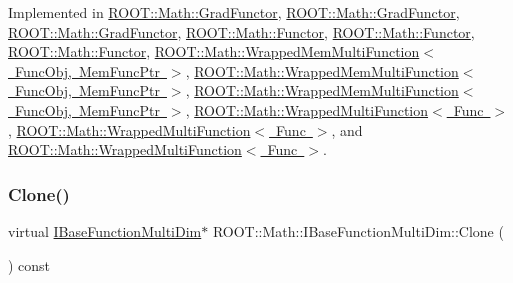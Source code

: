 Implemented in \mbox{\hyperlink{classROOT_1_1Math_1_1GradFunctor_a21093c0d3001069e49ce6278b5a32a40}{R\+O\+O\+T\+::\+Math\+::\+Grad\+Functor}}, \mbox{\hyperlink{classROOT_1_1Math_1_1GradFunctor_a21093c0d3001069e49ce6278b5a32a40}{R\+O\+O\+T\+::\+Math\+::\+Grad\+Functor}}, \mbox{\hyperlink{classROOT_1_1Math_1_1GradFunctor_a21093c0d3001069e49ce6278b5a32a40}{R\+O\+O\+T\+::\+Math\+::\+Grad\+Functor}}, \mbox{\hyperlink{classROOT_1_1Math_1_1Functor_a989f9b6dd160ebe03911cdee00dacaad}{R\+O\+O\+T\+::\+Math\+::\+Functor}}, \mbox{\hyperlink{classROOT_1_1Math_1_1Functor_a989f9b6dd160ebe03911cdee00dacaad}{R\+O\+O\+T\+::\+Math\+::\+Functor}}, \mbox{\hyperlink{classROOT_1_1Math_1_1Functor_a989f9b6dd160ebe03911cdee00dacaad}{R\+O\+O\+T\+::\+Math\+::\+Functor}}, \mbox{\hyperlink{classROOT_1_1Math_1_1WrappedMemMultiFunction_ab9f49fc9a151e8d921dbe9cb148c1fc8}{R\+O\+O\+T\+::\+Math\+::\+Wrapped\+Mem\+Multi\+Function$<$ Func\+Obj, Mem\+Func\+Ptr $>$}}, \mbox{\hyperlink{classROOT_1_1Math_1_1WrappedMemMultiFunction_ab9f49fc9a151e8d921dbe9cb148c1fc8}{R\+O\+O\+T\+::\+Math\+::\+Wrapped\+Mem\+Multi\+Function$<$ Func\+Obj, Mem\+Func\+Ptr $>$}}, \mbox{\hyperlink{classROOT_1_1Math_1_1WrappedMemMultiFunction_ab9f49fc9a151e8d921dbe9cb148c1fc8}{R\+O\+O\+T\+::\+Math\+::\+Wrapped\+Mem\+Multi\+Function$<$ Func\+Obj, Mem\+Func\+Ptr $>$}}, \mbox{\hyperlink{classROOT_1_1Math_1_1WrappedMultiFunction_aafa24e359a607b4278f1bf238bdbc336}{R\+O\+O\+T\+::\+Math\+::\+Wrapped\+Multi\+Function$<$ Func $>$}}, \mbox{\hyperlink{classROOT_1_1Math_1_1WrappedMultiFunction_aafa24e359a607b4278f1bf238bdbc336}{R\+O\+O\+T\+::\+Math\+::\+Wrapped\+Multi\+Function$<$ Func $>$}}, and \mbox{\hyperlink{classROOT_1_1Math_1_1WrappedMultiFunction_aafa24e359a607b4278f1bf238bdbc336}{R\+O\+O\+T\+::\+Math\+::\+Wrapped\+Multi\+Function$<$ Func $>$}}.

\mbox{\label{classROOT_1_1Math_1_1IBaseFunctionMultiDim_a57939204b1f525b43835b42e0635dd3b}} 
\subsubsection{\texorpdfstring{Clone()}{Clone()}\hspace{0.1cm}{\footnotesize\ttfamily [2/3]}}
{\footnotesize\ttfamily virtual \mbox{\hyperlink{classROOT_1_1Math_1_1IBaseFunctionMultiDim}{I\+Base\+Function\+Multi\+Dim}}$\ast$ R\+O\+O\+T\+::\+Math\+::\+I\+Base\+Function\+Multi\+Dim\+::\+Clone (\begin{DoxyParamCaption}{ }\end{DoxyParamCaption}) const\hspace{0.3cm}{\ttfamily [pure virtual]}}

